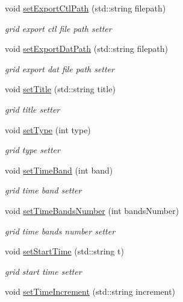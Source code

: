 \begin{DoxyCompactItemize}
void \hyperlink{classfwi_1_1grid_1_1Grid_ab138cac6c49037fc1b911a7a7d2eb437}{set\-Export\-Ctl\-Path} (std\-::string filepath)
\begin{DoxyCompactList}\small\item\em grid export ctl file path setter \end{DoxyCompactList}\item 
void \hyperlink{classfwi_1_1grid_1_1Grid_a84899af1e9496f79a7cf43459c62c9bc}{set\-Export\-Dat\-Path} (std\-::string filepath)
\begin{DoxyCompactList}\small\item\em grid export dat file path setter \end{DoxyCompactList}\item 
void \hyperlink{classfwi_1_1grid_1_1Grid_a0cdb2357ad4279db9bc990bb17eecef0}{set\-Title} (std\-::string title)
\begin{DoxyCompactList}\small\item\em grid title setter \end{DoxyCompactList}\item 
void \hyperlink{classfwi_1_1grid_1_1Grid_a6e7dc5bcf9d26a25289a324b2d4f8926}{set\-Type} (int type)
\begin{DoxyCompactList}\small\item\em grid type setter \end{DoxyCompactList}\item 
void \hyperlink{classfwi_1_1grid_1_1Grid_a3ed06b6c1a2ea5596c78256b2b872d81}{set\-Time\-Band} (int band)
\begin{DoxyCompactList}\small\item\em grid time band setter \end{DoxyCompactList}\item 
void \hyperlink{classfwi_1_1grid_1_1Grid_a19b83ec99e6280c7da1ad6b08cc3b921}{set\-Time\-Bands\-Number} (int bands\-Number)
\begin{DoxyCompactList}\small\item\em grid time bands number setter \end{DoxyCompactList}\item 
void \hyperlink{classfwi_1_1grid_1_1Grid_a9e75d99eef25e9a401aadd71ad646e08}{set\-Start\-Time} (std\-::string t)
\begin{DoxyCompactList}\small\item\em grid start time setter \end{DoxyCompactList}\item 
void \hyperlink{classfwi_1_1grid_1_1Grid_afc7b78751770989300220237fcae5256}{set\-Time\-Increment} (std\-::string increment)

\end{DoxyCompactItemize}

